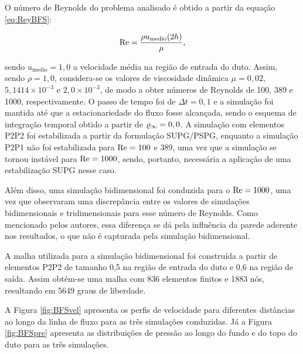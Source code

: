 O número de Reynolds do problema analisado é obtido a partir da equação \eqref{eq:ReyBFS}:

\begin{equation}
    \mathrm{Re}=\frac{\rho u_\mathrm{medio}(2h)}{\mu}\text{,}
    \label{eq:ReyBFS}
\end{equation}

\noindent sendo $u_\mathrm{medio}=1,0$ a velocidade média na região de entrada do duto. Assim, sendo $\rho=1,0$, considera-se os valores de viscosidade dinâmica $\mu=0,02$, $5,1414\times10^{-3}$ e $2,0\times10^{-3}$, de modo a obter números de Reynolds de 100, 389 e 1000, respectivamente. O passo de tempo foi de $\Delta t=0,1$ e a simulação foi mantida até que a estacionariedade do fluxo fosse alcançada, sendo o esquema de integração temporal obtido a partir de $\varrho_\infty=0,0$. A simulação com elementos P2P2 foi estabilizada a partir da formulação SUPG/PSPG, enquanto a simulação P2P1 não foi estabilizada para $\mathrm{Re}=100$ e $389$, uma vez que a simulação se tornou instável para $\mathrm{Re}=1000$, sendo, portanto, necessária a aplicação de uma estabilização SUPG nesse caso.

Além disso, uma simulação bidimensional foi conduzida para o $\mathrm{Re}=1000$, uma vez que  observaram uma discrepância entre os valores de simulações bidimensionais e tridimensionais para esse número de Reynolds. Como mencionado pelos autores, essa diferença se dá pela influência da parede aderente nos resultados, o que não é capturada pela simulação bidimensional.

A malha utilizada para a simulação bidimensional foi construída a partir de elementos P2P2 de tamanho 0,5 na região de entrada do duto e 0,6 na região de saída. Assim obtém-se uma malha com 836 elementos finitos e 1883 nós, resultando em 5649 graus de liberdade.

A Figura \ref{fig:BFSvel} apresenta os perfis de velocidade para diferentes distâncias ao longo da linha de fluxo para as três simulações conduzidas. Já a Figura \ref{fig:BFSpre} apresenta as distribuições de pressão ao longo do fundo e do topo do duto para as três simulações.

